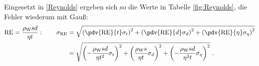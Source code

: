 Eingesetzt in \eqref{Reynolds} ergeben sich so die Werte in Tabelle \ref{fig:Reynolds}, die Fehler wiederum mit Gauß:
\begin{align}
	\text{RE} = \frac{\rho_\text{W} s d}{\eta t}: \qquad \sigma_{\text{RE}} &= \sqrt{\left(\pdv{\text{RE}}{t}\sigma_t\right)^2+\left(\pdv{\text{RE}}{d}\sigma_d\right)^2+\left(\pdv{\text{RE}}{\eta}\sigma_\eta\right)^2} \\
	&= \sqrt{\left(-\frac{\rho_\text{W}sd}{\eta t^2}\sigma_t\right)^2+\left(\frac{\rho_\text{W}s}{\eta t}\sigma_d\right)^2+\left(-\frac{\rho_\text{W}sd}{\eta^2 t}\sigma_\eta\right)^2} \ .
\end{align}

